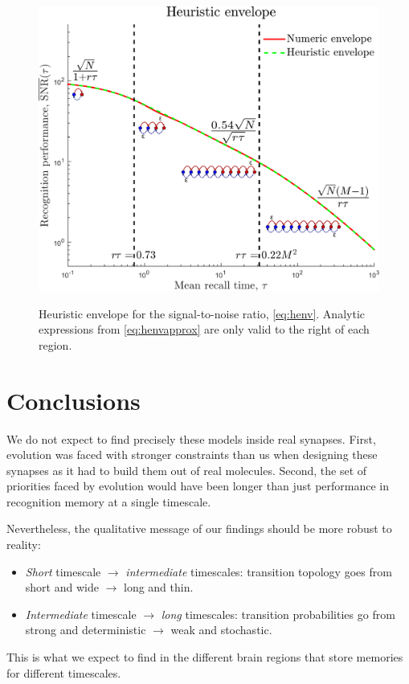 \documentclass[12pt]{article}
\begin{document}
\begin{figure}[tb]
  \centering
  \includegraphics[width=0.8\linewidth]{LenvHeuristic.svg}\\
  \caption[Heuristic envelope for the signal-to-noise ratio]
  {Heuristic envelope  for the signal-to-noise ratio, \cref{eq:henv}.
  Analytic expressions from \cref{eq:henvapprox} are only valid to the right of each region.}\label{fig:heuristicenv}
\end{figure}



\section{Conclusions}\label{sec:conclusions}


We do not expect to find precisely these models inside real synapses.
First, evolution was faced with stronger constraints than us when designing these synapses as it had to build them out of real molecules.
Second, the set of priorities faced by evolution would have been longer than just performance in recognition memory at a single timescale.

Nevertheless, the qualitative message of our findings should be more robust to reality:
%
\begin{itemize}
  \item \emph{Short} timescale $\to$ \emph{intermediate} timescales: transition topology goes from \\ short and wide $\to$ long and thin.
  \item \emph{Intermediate} timescale $\to$ \emph{long} timescales: transition probabilities go from \\ strong and deterministic $\to$ weak and stochastic.
\end{itemize}
%
This is what we expect to find in the different brain regions that store memories for different timescales.
\end{document}
